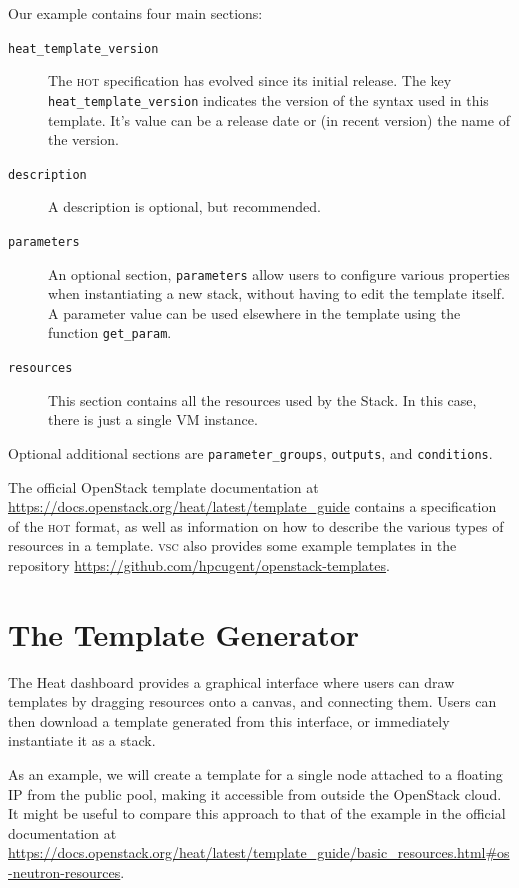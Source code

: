 Our example contains four main sections:
\begin{description}
\item[\texttt{heat\_template\_version}] The \textsc{hot} specification
  has evolved since its initial release.  The key
  \lstinline{heat_template_version} indicates the version of the
  syntax used in this template.  It's value can be a release date or
  (in recent version) the name of the version.
\item[\texttt{description}] A description is optional, but
  recommended.
\item[\texttt{parameters}] An optional section, \lstinline{parameters}
  allow users to configure various properties when instantiating a new
  stack, without having to edit the template itself.  A parameter
  value can be used elsewhere in the template using the function
  \lstinline{get_param}.
\item[\texttt{resources}] This section contains all the resources used
  by the Stack.  In this case, there is just a single VM instance.
\end{description}
Optional additional sections are \lstinline{parameter_groups},
\lstinline{outputs}, and \lstinline{conditions}.

The official OpenStack template documentation at
\url{https://docs.openstack.org/heat/latest/template_guide} contains a
specification of the \textsc{hot} format, as well as information on
how to describe the various types of resources in a template.
\textsc{vsc} also provides some example templates in the repository
\url{https://github.com/hpcugent/openstack-templates}.

\section{The Template Generator}\label{sec:template-generator}
The Heat dashboard provides a graphical interface where users can draw
templates by dragging resources onto a canvas, and connecting them.
Users can then download a template generated from this interface, or
immediately instantiate it as a stack.

As an example, we will create a template for a single node attached to
a floating IP from the public pool, making it accessible from outside
the OpenStack cloud.  It might be useful to compare this approach to
that of the example in the official documentation at
\url{https://docs.openstack.org/heat/latest/template_guide/basic_resources.html#os-neutron-resources}.

